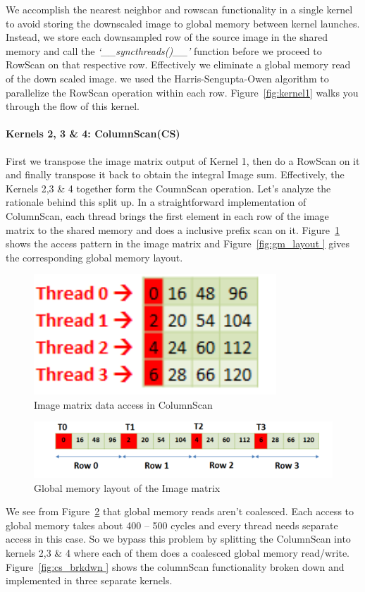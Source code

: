 We accomplish the nearest neighbor and rowscan functionality 
in a single kernel to avoid storing the downscaled image to 
global memory between kernel launches. Instead, we store 
each downsampled row of the source image in the shared memory 
and call the \textit{‘\_\_syncthreads()\_\_’} function before we proceed to 
RowScan on that respective row. Effectively we eliminate a global 
memory read of the down scaled image. we used the Harris-Sengupta-Owen 
algorithm to parallelize the RowScan operation within each row. 
Figure~\ref{fig:kernel1} walks you through the flow of this kernel.

\paragraph{Kernels 2, 3 \& 4: ColumnScan(CS)}
First we transpose the image matrix output of Kernel 1, then do a 
RowScan on it and finally transpose it back to obtain the integral Image sum. 
Effectively, the Kernels 2,3 \& 4 together form the CoumnScan operation. 
Let’s analyze the rationale behind this split up. In a straightforward 
implementation of ColumnScan, each thread brings the first element in each row of 
the image matrix to the shared memory and does a inclusive prefix scan on it. 
Figure~\ref{fig:cs_impl} shows the access pattern in the image matrix and 
Figure~\ref{fig:gm_layout } gives the corresponding global memory layout.

\begin{figure}[h]
  \centering
  \includegraphics[width=0.4\linewidth]{figs/img_matrix_crop.pdf}
  \caption{Image matrix data access in ColumnScan }
  \label{fig:cs_impl}
\end{figure}

\begin{figure}[h]
  \centering
  \includegraphics[width=\linewidth]{figs/global_mem_crop.pdf}
  \vspace{0.05in}
  \caption{Global memory layout of the Image matrix }
  \label{fig:gm_layout}
\end{figure}

We see from Figure~\ref{fig:gm_layout} that global memory reads aren’t coalesced. Each access to 
global memory takes about 400 – 500 cycles and every thread needs separate 
access in this case. So we bypass this problem by splitting the ColumnScan 
into kernels 2,3 \& 4 where each of them does a coalesced global memory read/write. 
Figure~\ref{fig:cs_brkdwn } shows the columnScan functionality broken down and implemented in three separate kernels. 


